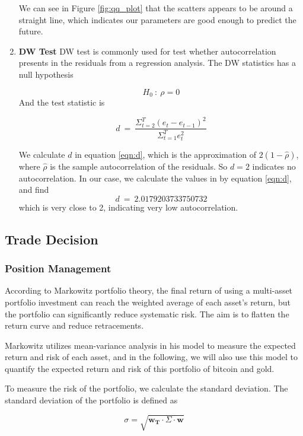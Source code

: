 \documentclass[12pt,a4paper]{article}
\begin{document}
\begin{spacing}{1.2}
\begin{enumerate}
	We can see in Figure \ref{fig:qq_plot} that the scatters appears to be around a straight line, which indicates our parameters are good enough to predict the future.
	
	\item \textbf{DW Test}
	DW test is commonly used for test whether autocorrelation presents in the residuals from a regression analysis. The DW statistics has a null hypothesis
	
$$
	H_0 \ : \ \rho = 0	
$$
	And the test statistic is
	
	\begin{equation}\label{eqn:d}
		d \ = \ \frac{\Sigma_{t=2}^T(e_t-e_{t-1})^2}{\Sigma_{t=1}^T e_t^2}
	\end{equation}

	We calculate $d$ in equation \ref{eqn:d}, which is the approximation of $2(1-\hat{\rho})$, where $\hat{\rho}$ is the sample autocorrelation of the residuals. So $d=2$ indicates no autocorrelation. In our case, we calculate the values in by equation \ref{eqn:d}, and find
	$$
	d \ = \ 2.0179203733750732
	$$
	which is very close to 2, indicating very low autocorrelation. 
\end{enumerate}

\subsection{Trade Decision}

\subsubsection{Position Management}
\label{sec:pos_management}

According to Markowitz portfolio theory, the final return of using a multi-asset portfolio investment can reach the weighted average of each asset's return, but the portfolio can significantly reduce systematic risk. The aim is to flatten the return curve and reduce retracements.

Markowitz utilizes mean-variance analysis in his model to measure the expected return and risk of each asset, and in the following, we will also use this model to quantify the expected return and risk of this portfolio of bitcoin and gold.

To measure the risk of the portfolio, we calculate the standard deviation. The standard deviation of the portfolio is defined as

$$
	\sigma = \sqrt{\mathbf{w_T}  \cdot \Sigma \cdot \mathbf{w}}
$$


\end{spacing}
\end{document}
